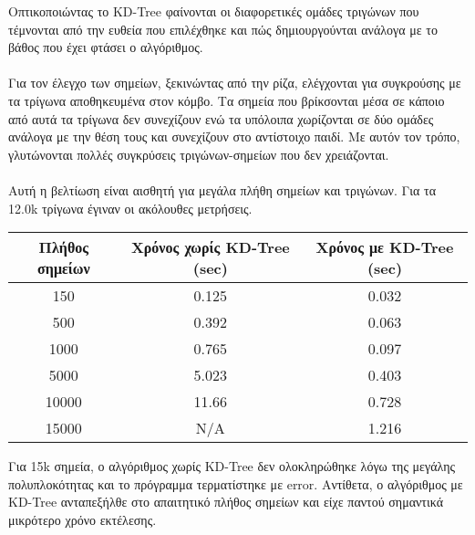 \documentclass{report}
\begin{document}
Οπτικοποιώντας το KD-Tree φαίνονται οι διαφορετικές ομάδες τριγώνων που τέμνονται από την ευθεία που επιλέχθηκε και πώς
δημιουργούνται ανάλογα με το βάθος που έχει φτάσει ο αλγόριθμος.
\\\\
Για τον έλεγχο των σημείων, ξεκινώντας από την ρίζα, ελέγχονται για συγκρούσης με τα τρίγωνα αποθηκευμένα στον κόμβο. Τα σημεία που
βρίκσονται μέσα σε κάποιο από αυτά τα τρίγωνα δεν συνεχίζουν ενώ τα υπόλοιπα χωρίζονται σε δύο ομάδες ανάλογα με την θέση τους
και συνεχίζουν στο αντίστοιχο παιδί. Με αυτόν τον τρόπο, γλυτώνονται πολλές συγκρύσεις τριγώνων-σημείων που δεν χρειάζονται.
\\\\
Αυτή η βελτίωση είναι αισθητή για μεγάλα πλήθη σημείων και τριγώνων. Για τα 12.0k τρίγωνα έγιναν οι ακόλουθες μετρήσεις.
\begin{table}[H]
    \centering
    \begin{tabular}{c||c c}
        Πλήθος σημείων & Χρόνος χωρίς KD-Tree (sec) & Χρόνος με KD-Tree (sec) \\
        \hline
        150 & 0.125 & 0.032 \\
        500 & 0.392 & 0.063 \\
        1000 & 0.765 & 0.097 \\
        5000 & 5.023 & 0.403 \\
        10000 & 11.66 & 0.728 \\
        15000 & Ν/Α & 1.216 \\
    \end{tabular} 
\end{table}

Για 15k σημεία, ο αλγόριθμος χωρίς KD-Tree δεν ολοκληρώθηκε λόγω της μεγάλης πολυπλοκότητας και το πρόγραμμα τερματίστηκε με error.
Αντίθετα, ο αλγόριθμος με KD-Tree ανταπεξήλθε στο απαιτητικό πλήθος σημείων και είχε παντού σημαντικά μικρότερο χρόνο εκτέλεσης.


\clearpage
{}
\end{document}
